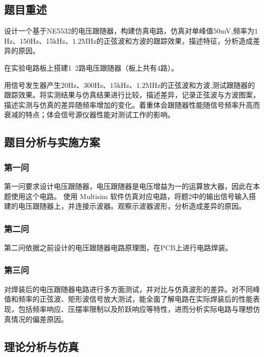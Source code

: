 \documentclass[./测控三级项目.tex]{subfiles} %
\begin{document}
	\subsection{题目重述}
	\begin{compactenum}
		\item 设计一个基于NE5532的电压跟随器，构建仿真电路，仿真对单峰值$50$mV,频率为$1$Hz、$150$Hz、15kHz、$1.2$MHz的正弦波和方波的跟踪效果，描述特征，分析造成差异的原因。
		\item 在实验电路板上搭建1~2路电压跟随器（板上共有4路）。
		\item 用信号发生器产生$20$Hz、$300$Hz、$15$kHz、$1.2$MHz的正弦波和方波,测试跟随器的跟踪效果。将实测结果与仿真结果进行比较，描述差异，记录正弦波与方波图案，描述实测与仿真的差异随频率增加的变化。着重体会跟随器性能随信号频率升高而衰减的特点；体会信号源仪器性能对测试工作的影响。
	\end{compactenum}
	\subsection{题目分析与实施方案}
	\subsubsection{第一问}
	第一问要求设计电压跟随器，电压跟随器是电压增益为一的运算放大器，因此在本题使用这个电路。
	使用 Multisim 软件仿真对应电路，将题2中的输出信号输入搭建的电压跟随器上，并连接示波器。观察示波器波形，分析造成差异的原因。
	\subsubsection{第二问}
	第二问依据之前设计的电压跟随器电路原理图，在PCB上进行电路焊装。
	\subsubsection{第三问}
	对焊装后的电压跟随器电路进行多方面测试，并对比与仿真波形的差异。对不同峰值和频率的正弦波、矩形波信号放大测试，能全面了解电路在实际焊装后的性能表现，包括频率响应、压摆率限制以及阶跃响应等特性，进而分析实际电路与理想仿真情况的偏差原因。
	
	\subsection{理论分析与仿真}
\end{document}

